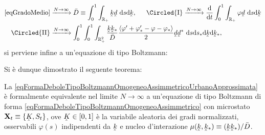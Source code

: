             \begin{equation*}
                \begin{aligned}
                    \cref{eqGradoMedio}&\xrightarrow{N\to\infty}
                    \bar D\equiv\int_0^1\int_{\RPlus}\underhat k\underhat d\ \de s\de\underhat k,
                    \hspace{1.5em}\Circled{\mathrm I}\xrightarrow{N\to\infty}
                    \derS{}t\int_0^1\int_{\RPlus}\varphi\underhat d\ \de s\de\underhat k\\
                    \Circled{\mathrm{II}}&\xrightarrow{N\to\infty}
                    \int_0^1\int_0^1\int_{\RPlus^2}\frac{\underhat k\underhat k_*}{\bar D}
                    \frac{\langle\varphi'+\varphi'_*-\varphi-\varphi_*\rangle}2
                    \underhat d\underhat d^*\ \de s\de s_*\de\underhat k\de\underhat k_*,
                \end{aligned}
            \end{equation*}
            si perviene infine a un'equazione di tipo Boltzmann:

            Si è dunque dimostrato il seguente teorema:

            \begin{teo}
                \label{teoRilassamentoTopologia}
                La \ref{eqFormaDeboleTipoBoltzmannOmogeneoAssimmetricoUrbanoApprossimata} è formalmente equivalente nel limite \(N\to\infty\) a un'equazione di tipo Boltzmann di forma \ref{eqFormaDeboleTipoBoltzmannOmogeneoAssimmetrico} con microstato \(\mathbf X_t\equiv\{\underhat K,S_t\}\), ove \(\underhat K\in[0,1]\) è la variabile aleatoria dei gradi normalizzati, osservabili \(\varphi(s)\) indipendenti da \(\underhat k\) e nucleo d'interazione \(\mu(\underhat k,\underhat k_*)\equiv(\underhat k\underhat k_*)/\bar D\).
            \end{teo}
            
